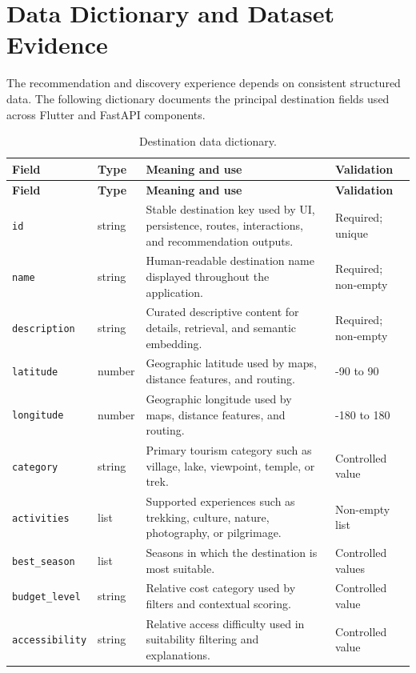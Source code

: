 \chapter{Data Dictionary and Dataset Evidence}
\label{app:data_dictionary}

The recommendation and discovery experience depends on consistent structured
data. The following dictionary documents the principal destination fields used
across Flutter and FastAPI components.

\begin{longtable}{p{3.2cm}p{2.2cm}p{6.1cm}p{2.5cm}}
\caption{Destination data dictionary.}\label{tbl:data_dictionary}\\
\toprule
\textbf{Field} & \textbf{Type} & \textbf{Meaning and use} & \textbf{Validation} \\
\midrule
\endfirsthead
\toprule
\textbf{Field} & \textbf{Type} & \textbf{Meaning and use} & \textbf{Validation} \\
\midrule
\endhead
\texttt{id} & string & Stable destination key used by UI, persistence, routes, interactions, and recommendation outputs. & Required; unique \\
\texttt{name} & string & Human-readable destination name displayed throughout the application. & Required; non-empty \\
\texttt{description} & string & Curated descriptive content for details, retrieval, and semantic embedding. & Required; non-empty \\
\texttt{latitude} & number & Geographic latitude used by maps, distance features, and routing. & -90 to 90 \\
\texttt{longitude} & number & Geographic longitude used by maps, distance features, and routing. & -180 to 180 \\
\texttt{category} & string & Primary tourism category such as village, lake, viewpoint, temple, or trek. & Controlled value \\
\texttt{activities} & list & Supported experiences such as trekking, culture, nature, photography, or pilgrimage. & Non-empty list \\
\texttt{best\_season} & list & Seasons in which the destination is most suitable. & Controlled values \\
\texttt{budget\_level} & string & Relative cost category used by filters and contextual scoring. & Controlled value \\
\texttt{accessibility} & string & Relative access difficulty used in suitability filtering and explanations. & Controlled value \\

\end{longtable}
